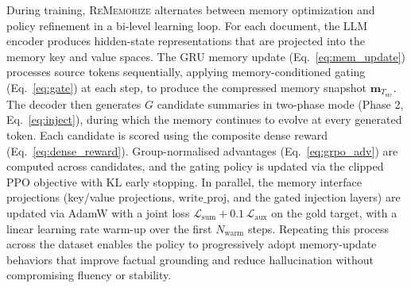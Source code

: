 \documentclass{article}
\begin{document}
During training, \textsc{ReMemorize} alternates between memory optimization and policy refinement in a bi-level learning loop.
For each document, the LLM encoder produces hidden-state representations that are projected into the memory key and value spaces.
The GRU memory update (Eq.~\ref{eq:mem_update}) processes source tokens sequentially, applying memory-conditioned gating (Eq.~\ref{eq:gate}) at each step, to produce the compressed memory snapshot $\mathbf{m}_{T_{\text{src}}}$.
The decoder then generates $G$ candidate summaries in two-phase mode (Phase 2, Eq.~\ref{eq:inject}), during which the memory continues to evolve at every generated token.
Each candidate is scored using the composite dense reward (Eq.~\ref{eq:dense_reward}).
Group-normalised advantages (Eq.~\ref{eq:grpo_adv}) are computed across candidates, and the gating policy is updated via the clipped PPO objective with KL early stopping.
In parallel, the memory interface projections (key/value projections, $\mathrm{write\_proj}$, and the gated injection layers) are updated via AdamW with a joint loss $\mathcal{L}_{\text{sum}} + 0.1\,\mathcal{L}_{\text{aux}}$ on the gold target, with a linear learning rate warm-up over the first $N_{\text{warm}}$ steps.
Repeating this process across the dataset enables the policy to progressively adopt memory-update behaviors that improve factual grounding and reduce hallucination without compromising fluency or stability.
\end{document}
